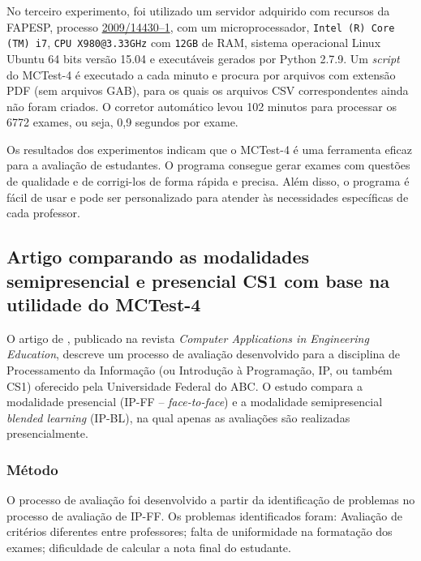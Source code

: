 No terceiro experimento, foi utilizado um servidor adquirido com recursos da FAPESP, processo \href{https://bv.fapesp.br/pt/auxilios/28430/modelagem-de-objetos-usando-morfologia-matematica-e-grafos-de-vizinhanca/}{2009/14430–1}, com um microprocessador, \verb|Intel (R) Core (TM) i7|, \verb|CPU X980@3.33GHz| com \verb|12GB| de RAM, sistema operacional Linux Ubuntu 64 bits versão 15.04 e executáveis gerados por Python 2.7.9. Um \textit{script} do MCTest-4 é executado a cada minuto e procura por arquivos com extensão PDF (sem arquivos GAB), para os quais os arquivos CSV correspondentes ainda não foram criados. O corretor automático levou 102 minutos para processar os 6772 exames, ou seja, 0,9 segundos por exame.

Os resultados dos experimentos indicam que o MCTest-4 é uma ferramenta eficaz para a avaliação de estudantes. O programa consegue gerar exames com questões de qualidade e de corrigi-los de forma rápida e precisa. Além disso, o programa é fácil de usar e pode ser personalizado para atender às necessidades específicas de cada professor.

\subsection{Artigo comparando as modalidades semipresencial e presencial CS1 com base na utilidade do MCTest-4}\label{sec:experMCTest-4revista}

O artigo de , publicado na revista \textit{Computer Applications in Engineering Education}, descreve um processo de avaliação desenvolvido para a disciplina de Processamento da Informação (ou Introdução à Programação, IP, ou também CS1) oferecido pela Universidade Federal do ABC. O estudo compara a modalidade presencial (IP-FF -- \textit{face-to-face}) e a modalidade semipresencial \textit{blended learning} (IP-BL), na qual apenas as avaliações são realizadas presencialmente. 

\subsubsection{Método}

O processo de avaliação foi desenvolvido a partir da identificação de problemas no processo de avaliação de IP-FF. Os problemas identificados foram: Avaliação de critérios diferentes entre professores; falta de uniformidade na formatação dos exames; dificuldade de calcular a nota final do estudante.

